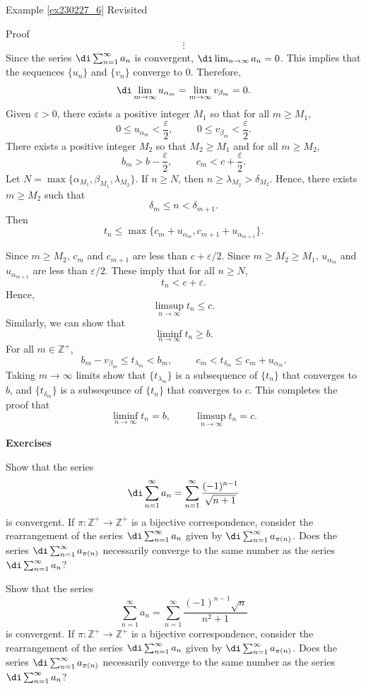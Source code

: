\begin{example}{\linkt Example \ref{ex230227_6} Revisited}
\begin{example}[label=ex230227_13]{}
\begin{myproof}{Proof}
\begin{gather*}
 \vdots
\end{gather*}
Since the series $\di\sum_{n=1}^{\infty}a_n$ is convergent, $\di\lim_{n\to\infty}a_n=0$. This implies that the sequences $\{u_n\}$ and $\{v_n\}$ converge  to $0$.  Therefore, \[\di\lim_{m\to\infty}u_{\alpha_m}=\lim_{m\to\infty}v_{\beta_m}=0.\]\bp
   Given $\varepsilon>0$,   there exists a positive integer $M_1$ so that for all $m\geq M_1$,
\[0\leq u_{\alpha_m}<\frac{\varepsilon}{2},\hspace{1cm} 0\leq v_{\beta_m}<\frac{\varepsilon}{2}.\] There exists a positive integer $M_2$ so that $M_2\geq M_1$ and  for all $m\geq M_2$,
\[b_m>b-\frac{\varepsilon}{2},\hspace{1cm}c_m<c+\frac{\varepsilon}{2}.\]
  Let $N=\max\{ \alpha_{M_1}, \beta_{M_1}, \lambda_{M_2}\}$. If  $n\geq N$,  then $n\geq \lambda_{M_2}>\delta_{M_2}$. Hence, there exists $m\geq M_2$ such that
\[\delta_m\leq n<\delta_{m+1}.\]Then
\[t_n\leq \max\{c_m+u_{\alpha_m}, c_{m+1}+u_{\alpha_{m+1}}\}.\]

Since $m\geq M_2$, $c_m$ and $c_{m+1}$ are less than $c+\varepsilon/2$. Since $m\geq M_2\geq M_1$, $u_{\alpha_m}$ and $u_{\alpha_{m+1}}$ are less than $\varepsilon/2$. These imply that for all $n\geq N$,
\[t_n<c+\varepsilon.\]
Hence,
\[\limsup_{n\to\infty} t_n\leq c.\]
Similarly, we can show that \[\liminf_{n\to\infty}t_n\geq b.\]
For all $m\in\mathbb{Z}^+$,
\[b_m-v_{\beta_m}\leq t_{\lambda_m}<b_m,\hspace{1cm}c_m<t_{\delta_m}\leq c_m+u_{\alpha_m}.\]
Taking $m\to\infty$ limits show that $\{t_{\lambda_m}\}$ is a subsequence of $\{t_n\}$ that converges to $b$, and $\{t_{\delta_m}\}$ is a subseqeunce of $\{t_n\}$ that converges to $c$. This completes the proof that \[\liminf_{n\to\infty}t_n=b,\hspace{1cm}\limsup_{n\to\infty}t_n=c.\]
\end{myproof}
\vp
\noindent
{\bf \large Exercises  \thesection}
\setcounter{myquestion}{1}

 \begin{question}{\themyquestion}Show that the series \[\di\sum_{n=1}^{\infty}a_n=\sum_{n=1}^{\infty}\frac{(-1)^{n-1}}{\sqrt{n+1}}\] is convergent. 
 If $\pi:\mathbb{Z}^+\to\mathbb{Z}^+$ is a bijective correspondence,   consider the rearrangement of the series $\di\sum_{n=1}^{\infty}a_{n}$ given by $\di\sum_{n=1}^{\infty}a_{\pi(n)}$. Does the series  $\di\sum_{n=1}^{\infty}a_{\pi(n)}$ necessarily converge to the same number as the series $\di\sum_{n=1}^{\infty}a_{n}$? 
  
 \end{question}
 \atc
 \begin{question}{\themyquestion}Show that the  series \[\sum_{n=1}^{\infty}a_n=\sum_{n=1}^{\infty}\frac{(-1)^{n-1}\sqrt{n}}{n^2+1}\] is convergent. 
 If $\pi:\mathbb{Z}^+\to\mathbb{Z}^+$ is a bijective correspondence,   consider the rearrangement of the series $\di\sum_{n=1}^{\infty}a_{n}$ given by $\di\sum_{n=1}^{\infty}a_{\pi(n)}$. Does the series  $\di\sum_{n=1}^{\infty}a_{\pi(n)}$ necessarily converge to the same number as the series $\di\sum_{n=1}^{\infty}a_{n}$? 
  

\end{question}
\end{example}
\end{example}
